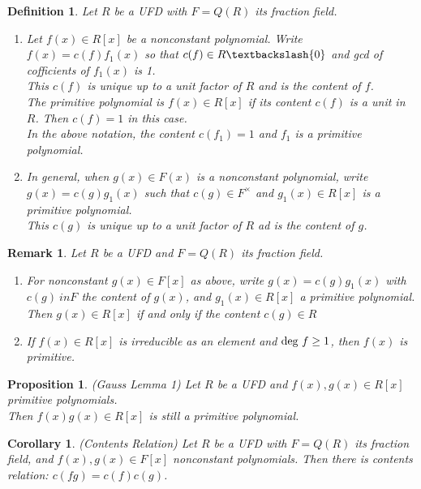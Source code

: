 \documentclass[a4paper,8pt]{article}
\newcommand{\hlt}[1]{\textit{{\color{blue}#1}}}
\newcommand{\degs}[1]{\textnormal{deg}#1}
\theoremstyle{theorem}
\newtheorem{corollary}[theorem]{Corollary}
\newtheorem{proposition}[theorem]{Proposition}
\newtheorem{definition}[theorem]{Definition}
\newtheorem{remark}[theorem]{Remark}
\begin{document}
\begin{definition}
Let $R$ be a UFD with $F=Q(R)$ its fraction field.
\begin{enumerate}[label=(\roman*)]
\item Let $f(x) \in R[x]$ be a nonconstant polynomial. Write $f(x) = c(f)f_1 (x)$ so that $c(f) \in R \textbackslash \{0\}$ and gcd of cofficients of $f_1(x)$ is 1.\\
This $c(f)$ is unique up to a unit factor of $R$ and is the \hlt{content} of $f$.\\
The \hlt{primitive polynomial} is $f(x) \in R[x]$ if its content $c(f)$ is a unit in $R$. Then $c(f)=1$ in this case.\\
In the above notation, the content $c(f_1) = 1$ and $f_1$ is a primitive polynomial.
\item In general, when $g(x) \in F(x)$ is a nonconstant polynomial, write $g(x)=c(g)g_1(x)$ such that $c(g) \in F^{\times}$ and $g_1(x) \in R[x]$ is a primitive polynomial.\\
This $c(g)$ is unique up to a unit factor of $R$ ad is the \hlt{content} of $g$.
\end{enumerate}
\end{definition}

\begin{remark}
Let $R$ be a UFD and $F=Q(R)$ its fraction field.
\begin{enumerate}[label=(\roman*)]
\item For nonconstant $g(x) \in F[x]$ as above, write $g(x)=c(g)g_1(x)$ with $c(g)\ in F$ the content of $g(x)$, and $g_1(x) \in R[x]$ a primitive polynomial.\\
Then $g(x) \in R[x]$ if and only if the content $c(g) \in R$
\item If $f(x) \in R[x]$ is irreducible as an element and $\degs \ f \geq 1$, then $f(x)$ is primitive.
\end{enumerate}
\end{remark}

\begin{proposition}
\hlt{(Gauss Lemma 1)} Let $R$ be a UFD and $f(x), g(x) \in R[x]$ primitive polynomials.\\
Then $f(x)g(x) \in R[x]$ is still a primitive polynomial.
\end{proposition}

\begin{corollary}
\hlt{(Contents Relation)} Let $R$ be a UFD with $F=Q(R)$ its fraction field, and $f(x), g(x) \in F[x]$ nonconstant polynomials. Then there is contents relation: $c(fg) = c(f)c(g)$.
\end{corollary}
\end{document}
